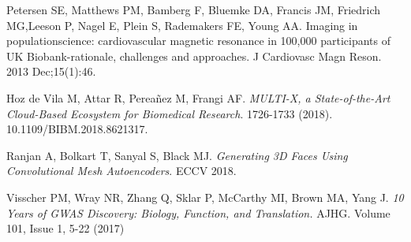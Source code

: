 \documentclass[twocolumn]{llncs}
\begin{document}
\begin{thebibliography}{8}
Petersen SE, Matthews PM, Bamberg F, Bluemke DA, Francis JM, Friedrich MG,Leeson  P,  Nagel  E,  Plein  S,  Rademakers  FE,  Young  AA.  Imaging  in  populationscience: cardiovascular magnetic resonance in 100,000 participants of UK Biobank-rationale, challenges and approaches. J Cardiovasc Magn Reson. 2013 Dec;15(1):46.


Hoz de Vila M, Attar R, Perea\~nez M, Frangi AF. \textit{MULTI-X, a State-of-the-Art Cloud-Based Ecosystem for Biomedical Research}. 1726-1733 (2018). 10.1109/BIBM.2018.8621317.

Ranjan A, Bolkart T, Sanyal S, Black MJ. \textit{Generating 3D Faces Using Convolutional Mesh Autoencoders}. ECCV 2018.

Visscher PM, Wray NR, Zhang Q, Sklar P, McCarthy MI, Brown MA, Yang J. \textit{10 Years of GWAS Discovery: Biology, Function, and Translation.} AJHG. Volume 101, Issue 1, 5-22 (2017)


\end{thebibliography}
\end{document}
